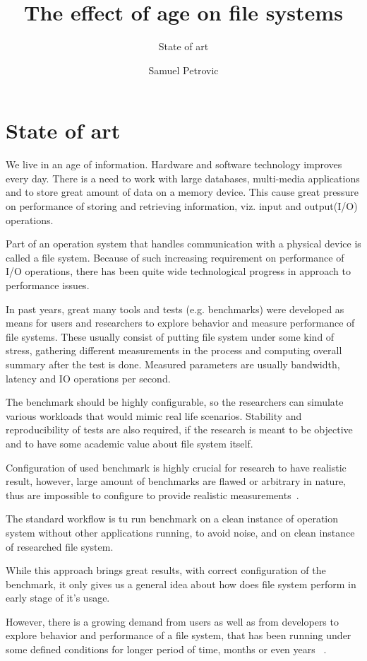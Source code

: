 \documentclass[color]{fithesis3}
\title{The effect of age on file systems}
\subtitle{State of art}
\author{Samuel Petrovic}
\begin{document}
\chapter{State of art}
We live in an age of information. Hardware and software technology improves every day. There is a need to work with large databases, multi-media applications and to store great amount of data on a memory device. This cause great pressure on performance of storing and retrieving information, viz. input and output(I/O) operations.

Part of an operation system that handles communication with a physical device is called a file system. Because of such increasing requirement on performance of I/O operations, there has been quite wide technological progress in approach to performance issues. 

In past years, great many tools and tests (e.g. benchmarks) were developed as means for users and researchers to explore behavior and measure performance of file systems. These usually consist of putting file system under some kind of stress, gathering different measurements in the process and computing overall summary after the test is done. Measured parameters are usually bandwidth, latency and IO operations per second.

The benchmark should be highly configurable, so the researchers can simulate various workloads that would mimic real life scenarios. Stability and reproducibility of tests are also required, if the research is meant to be objective and to have some academic value about file system itself. ~\cite{rocketscience:qhe}

Configuration of used benchmark is highly crucial for research to have realistic result, however, large amount of benchmarks are flawed or arbitrary in nature, thus are impossible to configure to provide realistic measurements~\cite{fsbench-article:qhe}.

The standard workflow is tu run benchmark on a clean instance of operation system without other applications running, to avoid noise, and on clean instance of researched file system. 

While this approach brings great results, with correct configuration of the benchmark, it only gives us a general idea about how does file system perform in early stage of it's usage. 

However, there is a growing demand from users as well as from developers to explore behavior and performance of a file system, that has been running under some defined conditions for longer period of time, months or even years ~\cite{harvardaging:qhe}.
\end{document}
